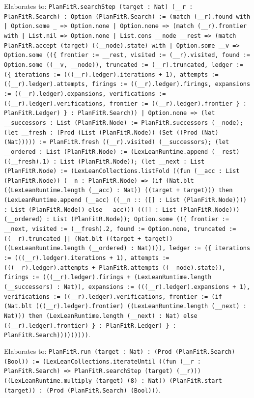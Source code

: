 \documentclass[11pt]{article}
\begin{document}
\noindent Elaborates to: \texttt{PlanFitR.searchStep (target : Nat) (\_\_r : PlanFitR.Search) : Option (PlanFitR.Search) := (match (\_\_r).found with | Option.some \_ => Option.none | Option.none => (match (\_\_r).frontier with | List.nil => Option.none | List.cons \_\_node \_\_rest => (match PlanFitR.accept (target) ((\_\_node).state) with | Option.some \_\_v => Option.some ((\{ frontier := \_\_rest, visited := (\_\_r).visited, found := Option.some ((\_\_v, \_\_node)), truncated := (\_\_r).truncated, ledger := (\{ iterations := (((\_\_r).ledger).iterations + 1), attempts := ((\_\_r).ledger).attempts, firings := ((\_\_r).ledger).firings, expansions := ((\_\_r).ledger).expansions, verifications := ((\_\_r).ledger).verifications, frontier := ((\_\_r).ledger).frontier \} : PlanFitR.Ledger) \} : PlanFitR.Search)) | Option.none => (let \_\_successors : List (PlanFitR.Node) := PlanFitR.successors (\_\_node); (let \_\_fresh : (Prod (List (PlanFitR.Node)) (Set ((Prod (Nat) (Nat))))) := PlanFitR.fresh ((\_\_r).visited) (\_\_successors); (let \_\_ordered : List (PlanFitR.Node) := (LexLeanRuntime.append (\_\_rest) ((\_\_fresh).1) : List (PlanFitR.Node)); (let \_\_next : List (PlanFitR.Node) := (LexLeanCollections.listFold ((fun (\_\_acc : List (PlanFitR.Node)) (\_\_n : PlanFitR.Node) => (if (Nat.blt ((LexLeanRuntime.length (\_\_acc) : Nat)) ((target + target))) then (LexLeanRuntime.append (\_\_acc) ((\_\_n :: ([] : List (PlanFitR.Node)))) : List (PlanFitR.Node)) else \_\_acc))) (([] : List (PlanFitR.Node))) (\_\_ordered) : List (PlanFitR.Node)); Option.some ((\{ frontier := \_\_next, visited := (\_\_fresh).2, found := Option.none, truncated := ((\_\_r).truncated || (Nat.blt ((target + target)) ((LexLeanRuntime.length (\_\_ordered) : Nat)))), ledger := (\{ iterations := (((\_\_r).ledger).iterations + 1), attempts := (((\_\_r).ledger).attempts + PlanFitR.attempts ((\_\_node).state)), firings := (((\_\_r).ledger).firings + (LexLeanRuntime.length (\_\_successors) : Nat)), expansions := (((\_\_r).ledger).expansions + 1), verifications := ((\_\_r).ledger).verifications, frontier := (if (Nat.blt (((\_\_r).ledger).frontier) ((LexLeanRuntime.length (\_\_next) : Nat))) then (LexLeanRuntime.length (\_\_next) : Nat) else ((\_\_r).ledger).frontier) \} : PlanFitR.Ledger) \} : PlanFitR.Search)))))))))}.\par
\noindent Elaborates to: \texttt{PlanFitR.run (target : Nat) : (Prod (PlanFitR.Search) (Bool)) := (LexLeanCollections.iterateUntil ((fun (\_\_r : PlanFitR.Search) => PlanFitR.searchStep (target) (\_\_r))) ((LexLeanRuntime.multiply (target) (8) : Nat)) (PlanFitR.start (target)) : (Prod (PlanFitR.Search) (Bool)))}.\par
\end{document}
